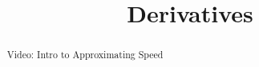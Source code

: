 \documentclass[handout]{ximera}
\title{Derivatives}
\begin{document}
\begin{abstract}Video: Intro to Approximating Speed %
\end{abstract}

\maketitle

\end{document}
